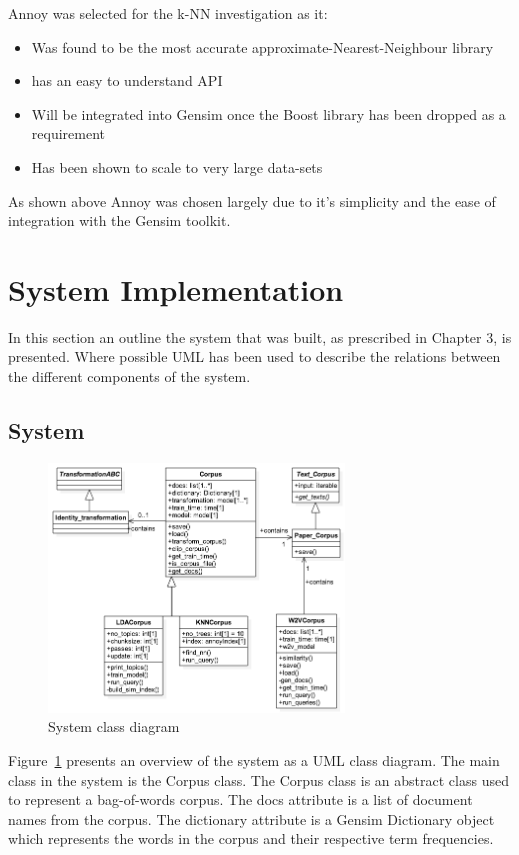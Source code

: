 Annoy was selected for the k-NN investigation as it:
\begin{itemize}
    \item Was found to be the most accurate approximate-Nearest-Neighbour library
    \item has an easy to understand API
    \item Will be integrated into Gensim once the Boost library has been dropped as a requirement
    \item Has been shown to scale to very large data-sets
\end{itemize}

As shown above Annoy was chosen largely due to it's simplicity and the ease of integration with the Gensim toolkit.

\section{System Implementation}
In this section an outline the system that was built, as prescribed in Chapter 3, is presented.
Where possible UML has been used to describe the relations between the different components of the system.

\subsection{System}
\begin{figure}[h]
    \centering
        \includegraphics[width=0.7\textwidth]{Figures/FYPClassDiagram.png}
    \caption{System class diagram}
    \label{fig:UMLClass}
\end{figure}

Figure~\ref{fig:UMLClass} presents an overview of the system as a UML class diagram.
The main class in the system is the Corpus class.
The Corpus class is an abstract class used to represent a bag-of-words corpus.
The docs attribute is a list of document names from the corpus.
The dictionary attribute is a Gensim Dictionary object which represents the words in the corpus and their respective term frequencies.

